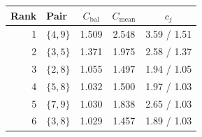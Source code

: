 \begin{tabular}{rlccc}
\toprule
Rank & Pair & $C_{\mathrm{bal}}$ & $C_{\mathrm{mean}}$ & $c_j$ \\
\midrule
1 & $\{4,9\}$ & 1.509 & 2.548 & 3.59 / 1.51 \\
2 & $\{3,5\}$ & 1.371 & 1.975 & 2.58 / 1.37 \\
3 & $\{2,8\}$ & 1.055 & 1.497 & 1.94 / 1.05 \\
4 & $\{5,8\}$ & 1.032 & 1.500 & 1.97 / 1.03 \\
5 & $\{7,9\}$ & 1.030 & 1.838 & 2.65 / 1.03 \\
6 & $\{3,8\}$ & 1.029 & 1.457 & 1.89 / 1.03 \\
\bottomrule
\end{tabular}
